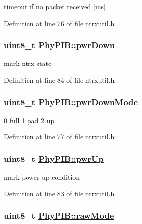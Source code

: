 timeout if no packet received \mbox{[}ms\mbox{]} 

Definition at line 76 of file ntrxutil.h.\hypertarget{structPhyPIB_81348ee11b93c57fe6a1d8af03a0246a}{
\subsubsection[pwrDown]{\setlength{\rightskip}{0pt plus 5cm}uint8\_\-t \hyperlink{structPhyPIB_81348ee11b93c57fe6a1d8af03a0246a}{Phy\-PIB::pwr\-Down}}}
\label{structPhyPIB_81348ee11b93c57fe6a1d8af03a0246a}


mark ntrx state 

Definition at line 84 of file ntrxutil.h.\hypertarget{structPhyPIB_5497aeeb7e5fd935c8f167e094f12b4a}{
\subsubsection[pwrDownMode]{\setlength{\rightskip}{0pt plus 5cm}uint8\_\-t \hyperlink{structPhyPIB_5497aeeb7e5fd935c8f167e094f12b4a}{Phy\-PIB::pwr\-Down\-Mode}}}
\label{structPhyPIB_5497aeeb7e5fd935c8f167e094f12b4a}


0 full 1 pad 2 up 

Definition at line 77 of file ntrxutil.h.\hypertarget{structPhyPIB_31b89c3ffa3b9f41761eea63187b747f}{
\subsubsection[pwrUp]{\setlength{\rightskip}{0pt plus 5cm}uint8\_\-t \hyperlink{structPhyPIB_31b89c3ffa3b9f41761eea63187b747f}{Phy\-PIB::pwr\-Up}}}
\label{structPhyPIB_31b89c3ffa3b9f41761eea63187b747f}


mark power up condition 

Definition at line 83 of file ntrxutil.h.\hypertarget{structPhyPIB_d4a13e7ef40fdd6bb3beb85cd0abc810}{
\subsubsection[rawMode]{\setlength{\rightskip}{0pt plus 5cm}uint8\_\-t \hyperlink{structPhyPIB_d4a13e7ef40fdd6bb3beb85cd0abc810}{Phy\-PIB::raw\-Mode}}}
\label{structPhyPIB_d4a13e7ef40fdd6bb3beb85cd0abc810}


